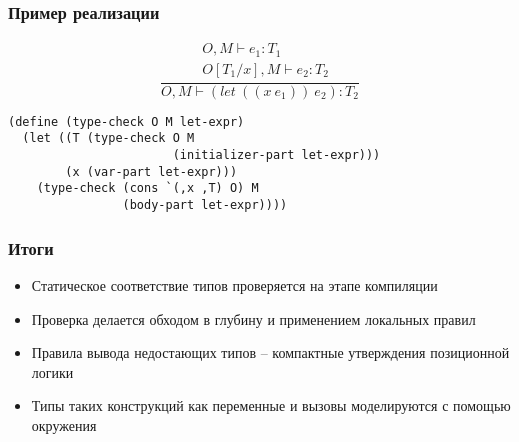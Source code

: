 \documentclass[16pt,pdf,unicode]{beamer}
\begin{document}
\begin{frame}[fragile]
  \frametitle{Пример реализации}
\begin{exampleblock}{}
\[\frac{\begin{aligned} &O,M\vdash e_1:T_1 \\ &O[T_1/x],M\vdash e_2:T_2
\end{aligned}}{O,M\vdash (let\ ((x\ e_1))\ e_2):T_2}\]
\end{exampleblock}
\begin{lstlisting}
(define (type-check O M let-expr)
  (let ((T (type-check O M
                       (initializer-part let-expr)))
        (x (var-part let-expr)))
    (type-check (cons `(,x ,T) O) M
                (body-part let-expr))))
\end{lstlisting}
\end{frame}

\begin{frame}
  \frametitle{Итоги}
\begin{itemize}
  \item Статическое соответствие типов проверяется на этапе компиляции
  \item Проверка делается обходом в глубину и применением локальных правил
  \item Правила вывода недостающих типов -- компактные утверждения позиционной логики
  \item Типы таких конструкций как переменные и вызовы моделируются с помощью окружения
\end{itemize}
\end{frame}
\end{document}
